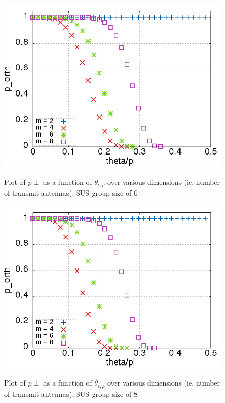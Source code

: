 \begin{figure}
    \includegraphics[width=12cm]{figs/p_orth_gs_6.png}\\
    \caption{Plot of $p{\perp}$ as a function of $\theta_{\epsilon,\rho}$ over various dimensions (ie. number of transmit antennas), SUS group size of 6}
    \label{fig:p_orth_gs_6}
\end{figure}

\begin{figure}
    \includegraphics[width=12cm]{figs/p_orth_gs_8.png}\\
    \caption{Plot of $p{\perp}$ as a function of $\theta_{\epsilon,\rho}$ over various dimensions (ie. number of transmit antennas), SUS group size of 8}
    \label{fig:p_orth_gs_8}
\end{figure}
\newpage
